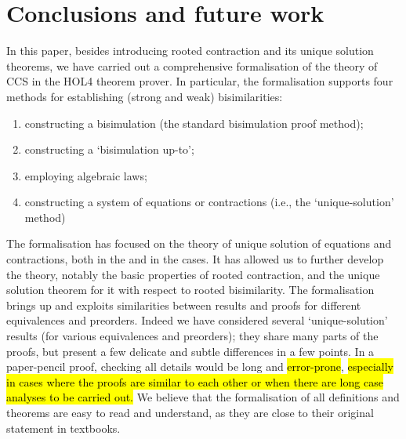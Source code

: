 
\section{Conclusions and future work}
\label{s:concl}

In this paper, besides  introducing rooted contraction and its
unique solution theorems,
we have carried out a comprehensive formalisation of the theory of CCS in the 
HOL4 theorem prover. In particular, the formalisation supports four
methods for establishing (strong and weak) bisimilarities:
\begin{enumerate}
\item constructing a bisimulation (the standard bisimulation proof
method);
\item constructing a `bisimulation up-to'; 
\item employing algebraic laws;
\item constructing a system of equations or contractions
(i.e., the `unique-solution' method)
\end{enumerate}

The formalisation has focused on the theory of
unique solution of equations and contractions, both in the  \univariate and
in the \multivariate cases. It    
 has allowed us to further develop the theory,
notably the basic properties of rooted contraction, and the unique
solution theorem for it with respect to rooted bisimilarity. 
The formalisation brings up and exploits similarities between results
and proofs for different equivalences and preorders. Indeed we have
considered several `unique-solution' results (for various equivalences
and preorders); they share many parts of the proofs, but present a few
delicate and subtle differences in a few points. In a paper-pencil
proof, checking all details would be long and \hl{error-prone},
\hl{especially in cases where the proofs are similar to each other or
  when there are long case analyses to be carried out.}
We believe that the formalisation of  all definitions and
theorems are easy to read and
understand, as they are close to their original statement in
textbooks.

